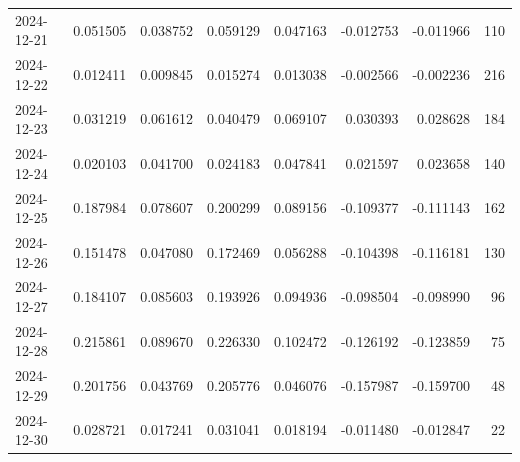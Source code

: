 \begin{tabular}{lrrrrrrr}
2024-12-21 & 0.051505 & 0.038752 & 0.059129 & 0.047163 & -0.012753 & -0.011966 & 110 \\
2024-12-22 & 0.012411 & 0.009845 & 0.015274 & 0.013038 & -0.002566 & -0.002236 & 216 \\
2024-12-23 & 0.031219 & 0.061612 & 0.040479 & 0.069107 & 0.030393 & 0.028628 & 184 \\
2024-12-24 & 0.020103 & 0.041700 & 0.024183 & 0.047841 & 0.021597 & 0.023658 & 140 \\
2024-12-25 & 0.187984 & 0.078607 & 0.200299 & 0.089156 & -0.109377 & -0.111143 & 162 \\
2024-12-26 & 0.151478 & 0.047080 & 0.172469 & 0.056288 & -0.104398 & -0.116181 & 130 \\
2024-12-27 & 0.184107 & 0.085603 & 0.193926 & 0.094936 & -0.098504 & -0.098990 & 96 \\
2024-12-28 & 0.215861 & 0.089670 & 0.226330 & 0.102472 & -0.126192 & -0.123859 & 75 \\
2024-12-29 & 0.201756 & 0.043769 & 0.205776 & 0.046076 & -0.157987 & -0.159700 & 48 \\
2024-12-30 & 0.028721 & 0.017241 & 0.031041 & 0.018194 & -0.011480 & -0.012847 & 22 \\
\bottomrule
\end{tabular}
